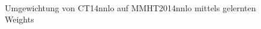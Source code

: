 \begin{figure}[tbp]
	\centering
	 \\
	\caption{Umgewichtung von CT14nnlo auf MMHT2014nnlo mittels gelernten Weights}
	\label{reweight-angewendet}
\end{figure}

